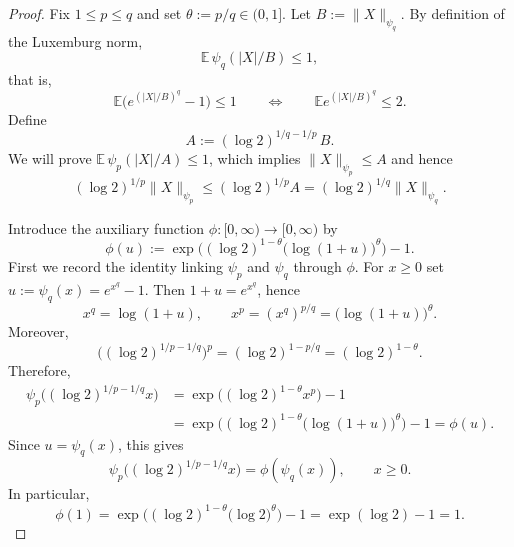 \documentclass[12pt]{article}
\renewcommand{\(}{\left(}%
\renewcommand{\)}{\right)}%
\renewcommand{\[}{\left[}%
\renewcommand{\]}{\right]}%
\newtheorem{proof}{Proof.}}
\begin{document}
\begin{proof}
Fix $1\le p\le q$ and set $\theta:=p/q\in(0,1]$. Let $B:=\|X\|_{\psi_q}$. By definition of the Luxemburg norm,
\begin{equation*}
\mathbb{E}\,\psi_q(|X|/B)\le 1,
\end{equation*}
that is,
\begin{equation*}
\mathbb{E}\big(e^{(|X|/B)^q}-1\big)\le 1
\qquad\Longleftrightarrow\qquad
\mathbb{E}e^{(|X|/B)^q}\le 2.
\end{equation*}
Define
\begin{equation*}
A:=(\log 2)^{1/q-1/p}\,B.
\end{equation*}
We will prove $\mathbb{E}\,\psi_p(|X|/A)\le 1$, which implies $\|X\|_{\psi_p}\le A$ and hence
\begin{equation*}
(\log 2)^{1/p}\|X\|_{\psi_p}\le (\log 2)^{1/p}A=(\log 2)^{1/q}\|X\|_{\psi_q}.
\end{equation*}

Introduce the auxiliary function $\phi:[0,\infty)\to[0,\infty)$ by
\begin{equation*}
\phi(u):=\exp\Big((\log 2)^{1-\theta}\big(\log(1+u)\big)^{\theta}\Big)-1.
\end{equation*}
First we record the identity linking $\psi_p$ and $\psi_q$ through $\phi$. For $x\ge 0$ set $u:=\psi_q(x)=e^{x^q}-1$. Then $1+u=e^{x^q}$, hence
\begin{equation*}
x^q=\log(1+u),
\qquad
x^p=(x^q)^{p/q}=\big(\log(1+u)\big)^{\theta}.
\end{equation*}
Moreover,
\begin{equation*}
\big((\log 2)^{1/p-1/q}\big)^p=(\log 2)^{1-p/q}=(\log 2)^{1-\theta}.
\end{equation*}
Therefore,
\begin{equation*}
\begin{split}
	\psi_p\big((\log 2)^{1/p-1/q}x\big)
&=\exp\Big((\log 2)^{1-\theta}x^p\Big)-1\\
&=\exp\Big((\log 2)^{1-\theta}\big(\log(1+u)\big)^\theta\Big)-1
=\phi(u).
\end{split}
\end{equation*}
Since $u=\psi_q(x)$, this gives
\begin{equation*}
\psi_p\big((\log 2)^{1/p-1/q}x\big)=\phi(\psi_q(x)),
\qquad x\ge 0.
\end{equation*}
In particular,
\begin{equation*}
\phi(1)
=\exp\Big((\log 2)^{1-\theta}\big(\log 2\big)^\theta\Big)-1
=\exp(\log 2)-1
=1.
\end{equation*}


\end{proof}
\end{document}
